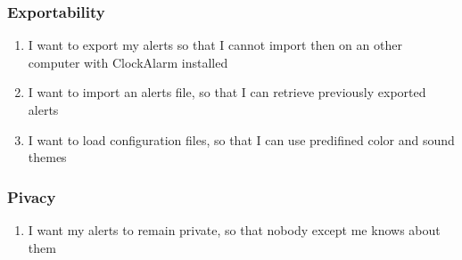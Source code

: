 \subsubsection{Exportability}
\begin{enumerate}
	\setcounter{enumi}{\value{counter}}
	\item I want to export my alerts so that I cannot import then on an other computer with ClockAlarm installed
	\item I want to import an alerts file, so that I can retrieve previously exported alerts
	\item I want to load configuration files, so that I can use predifined color and sound themes
	\setcounter{counter}{\value{enumi}}
\end{enumerate}
\subsubsection{Pivacy}
\begin{enumerate}
	\setcounter{enumi}{\value{counter}}
	\item I want my alerts to remain private, so that nobody except me knows about them
\end{enumerate}
